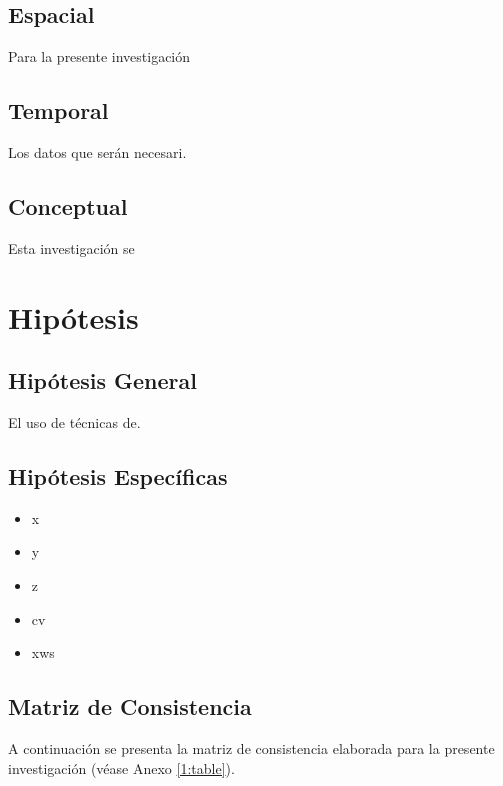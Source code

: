 \subsection{Espacial}
Para la presente investigación 

\subsection{Temporal}
Los datos que serán necesari. 

\subsection{Conceptual}
Esta investigación se 

\section{Hipótesis}

\subsection{Hipótesis General}
\newcommand{\HipotesisGeneral}{
El uso de técnicas de.
}
\HipotesisGeneral
\subsection{Hipótesis Específicas}
\newcommand{\Hone}{
	x
}
\newcommand{\Htwo}{
	y
}
\newcommand{\Hthree}{
	z	
}
\newcommand{\Hfour}{
	cv
}
\newcommand{\Hfive}{
	xws
}
\begin{itemize}
	\item \Hone
	\item \Htwo
	\item \Hthree
	\item \Hfour
	\item \Hfive
\end{itemize}

\subsection{Matriz de Consistencia}
A continuación se presenta la matriz de consistencia elaborada para la presente investigación (véase Anexo \ref{1:table}).

